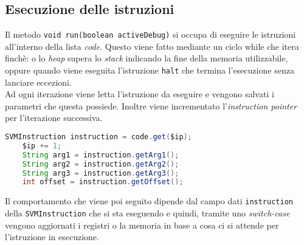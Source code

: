 \documentclass[../report.tex]{subfiles}
\begin{document}
\subsection{Esecuzione delle istruzioni}
Il metodo \verb|void run(boolean activeDebug)| si occupa di eseguire le istruzioni all'interno della lista \textit{code}. Questo viene fatto mediante un ciclo while che itera finch\`e: o lo \textit{heap} supera lo \textit{stack} indicando la fine della memoria utilizzabile, oppure quando viene eseguita l'istruzione \verb|halt| che termina l'esecuzione senza lanciare eccezioni.\\
Ad ogni iterazione viene letta l'istruzione da eseguire e vengono salvati i parametri che questa possiede. Inoltre viene incrementato l'\textit{instruction pointer} per l'iterazione successiva.
\begin{lstlisting}[language=Java]
    SVMInstruction instruction = code.get($ip);
    $ip += 1;
    String arg1 = instruction.getArg1();
    String arg2 = instruction.getArg2();
    String arg3 = instruction.getArg3();
    int offset = instruction.getOffset();
\end{lstlisting}
Il comportamento che viene poi seguito dipende dal campo dati \verb|instruction| della \verb|SVMInstruction| che si sta eseguendo e quindi, tramite uno \textit{switch-case} vengono aggiornati i registri o la memoria in base a cosa ci si attende per l'istruzione in esecuzione.
\end{document}
